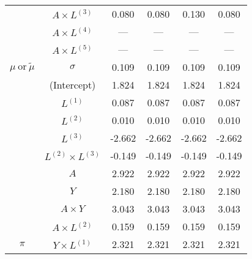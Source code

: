 \begin{table}
\begin{minipage}[t]{0.5\textwidth}
\begin{tabular}[t]{|>{}c|c|c|c|c|>{}c|}
 & $A \times L^{(3)}$ & 0.080 & 0.080 & 0.130 & 0.080\\
\cline{2-6}
 & $A \times L^{(4)}$ & --- & --- & --- & ---\\
\cline{2-6}
 & $A \times L^{(5)}$ & --- & --- & --- & ---\\
\cline{2-6}
\multirow{-15}{*}{\centering\arraybackslash $\mu~\text{or}~\tilde\mu$} & $\sigma$ & 0.109 & 0.109 & 0.109 & 0.109\\
\cline{1-6}
 & (Intercept) & 1.824 & 1.824 & 1.824 & 1.824\\
\cline{2-6}
 & $L^{(1)}$ & 0.087 & 0.087 & 0.087 & 0.087\\
\cline{2-6}
 & $L^{(2)}$ & 0.010 & 0.010 & 0.010 & 0.010\\
\cline{2-6}
 & $L^{(3)}$ & -2.662 & -2.662 & -2.662 & -2.662\\
\cline{2-6}
 & $L^{(2)} \times L^{(3)}$ & -0.149 & -0.149 & -0.149 & -0.149\\
\cline{2-6}
 & $A$ & 2.922 & 2.922 & 2.922 & 2.922\\
\cline{2-6}
 & $Y$ & 2.180 & 2.180 & 2.180 & 2.180\\
\cline{2-6}
 & $A\times Y$ & 3.043 & 3.043 & 3.043 & 3.043\\
\cline{2-6}
 & $A \times L^{(2)}$ & 0.159 & 0.159 & 0.159 & 0.159\\
\cline{2-6}
\multirow{-10}{*}{\centering\arraybackslash $\pi$} & $Y \times L^{(1)}$ & 2.321 & 2.321 & 2.321 & 2.321\\
\hline
\end{tabular}
\end{minipage}
\begin{minipage}[t]{0.5\textwidth}


\end{minipage}
\end{table}
